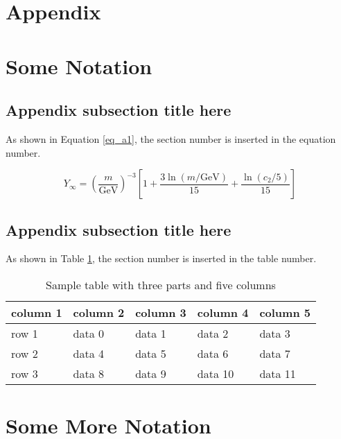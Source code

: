 \documentclass[12pt,a4paper]{article}
\begin{document}
\begin{appendices}

\section*{Appendix}
\section{Some Notation}
\lipsum[10]

\subsection{Appendix subsection title here}
As shown in Equation \ref{eq_a1}, the section number is inserted in the equation number.
\lipsum[11]

\begin{equation}
Y_\infty = \left( \frac{m}{\textrm{GeV}} \right)^{-3}
    \left[ 1 + \frac{3 \ln(m/\textrm{GeV})}{15}
    + \frac{\ln(c_2/5)}{15} \right]
\label{eq_a1}
\end{equation}

\subsection{Appendix subsection  title here}
As shown in Table \ref{tab_a1}, the section number is inserted in the table number.
\lipsum[12]

\begin{table}[!ht]
\caption{Sample table with three parts and five columns\label{tab_a1}}
\begin{threeparttable}
\begin{tabular*}{\columnwidth}{@{\extracolsep\fill}lllll@{\extracolsep\fill}}
\toprule
column 1 & column 2 & column 3 & column 4 & column 5\\
\midrule
row 1 & data 0 & data 1 & data 2 & data 3 \\
row 2 & data 4 & data 5 & data 6 & data 7 \\
row 3 & data 8 & data 9 & data 10 & data 11\\
\bottomrule
\end{tabular*}
\end{threeparttable}
\end{table}

\section{Some More Notation}


\end{appendices}
\end{document}
